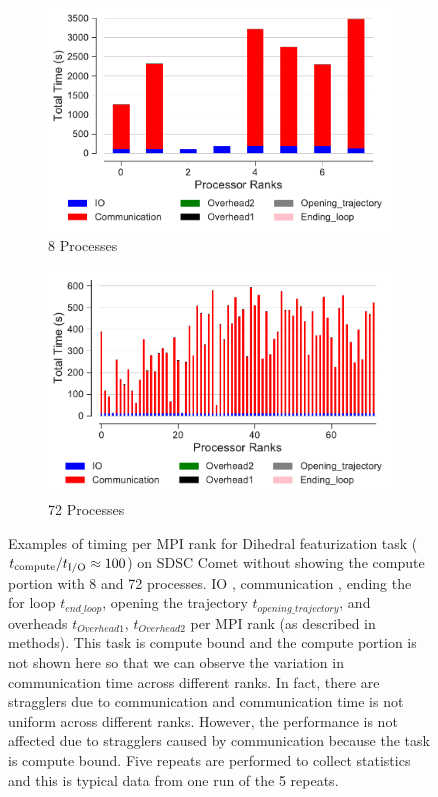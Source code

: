\begin{figure}[ht!]
\centering
\begin{subfigure}{.47\textwidth}
  \includegraphics[width=\linewidth]{figures/main-dihedral-BarPlot-rank-comm-comparison_8_5.pdf}
  \caption{8 Processes}
  \label{fig:comm-rank-dihed-8}
\end{subfigure}
\bigskip
\begin{subfigure} {.47\textwidth}
  \includegraphics[width=\linewidth]{figures/main-dihedral-BarPlot-rank-comm-comparison_72_5.pdf}
  \caption{72 Processes}
  \label{fig:comm-rank-dihed-72}
\end{subfigure}
%
\caption{Examples of timing per MPI rank for Dihedral featurization task (${t}_{\text{compute}}/{t}_{\text{I/O}} \approx 100$) on SDSC Comet without showing the compute portion with 8 and 72 processes.
IO \tIO, communication \tcomm, ending the for loop $t_{end\_loop}$, opening the trajectory $t_{opening\_trajectory}$, and overheads $t_{Overhead1}$,  
$t_{Overhead2}$ per MPI rank (as described in methods).
This task is compute bound and the compute portion is not shown here so that we can observe the variation in communication time across different ranks. 
In fact, there are stragglers due to communication and communication time is not uniform across different ranks. 
However, the performance is not affected due to stragglers caused by communication because the task is compute bound.
Five repeats are performed to collect statistics and this is typical data from one run of the 5 repeats.}
\label{fig:MPIwithIO-comm-dihed-rank}
\end{figure} 

